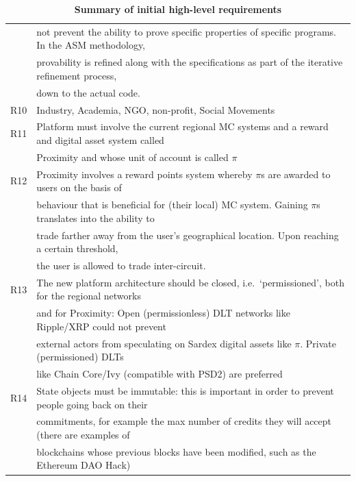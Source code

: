 \begin{table}[htbp]
\begin{centering}
{\begin{tabular}{| l | l | }
&\hspace{0.5cm}not prevent the ability to prove specific properties of specific programs. In the ASM methodology,\\
&\hspace{0.5cm}provability is refined along with the specifications as part of the iterative refinement process,\\
&\hspace{0.5cm}down to the actual code.\\
\hline
R10 &Industry, Academia, NGO, non-profit, Social Movements\\
\hline
R11 &Platform must involve the current regional MC systems and a reward and digital asset system called\\
&\hspace{0.5cm}Proximity and whose unit of account is called $\pi$\\
\hline
R12 &Proximity involves a reward points system whereby $\pi$s are awarded to users on the basis of\\
&\hspace{0.5cm}behaviour that is beneficial for (their local) MC system. Gaining $\pi$s translates into the ability to\\
&\hspace{0.5cm}trade farther away from the user's geographical location. Upon reaching a certain threshold,\\
&\hspace{0.5cm}the user is allowed to trade inter-circuit.  \\
\hline
R13 &The new platform architecture should be closed, i.e.\ `permissioned', both for the regional networks\\
&\hspace{0.5cm}and for Proximity: Open (permissionless) DLT networks like Ripple/XRP could not prevent\\
&\hspace{0.5cm}external actors from speculating on Sardex digital assets like $\pi$. Private (permissioned) DLTs\\
&\hspace{0.5cm}like Chain Core/Ivy (compatible with PSD2) are preferred \\
\hline
R14 &State objects must be immutable: this is important in order to prevent people going back on their\\
&\hspace{0.5cm}commitments, for example the max number of credits they will accept (there are examples of\\
&\hspace{0.5cm}blockchains whose previous blocks have been modified, such as the Ethereum DAO Hack)  \\
\hline
\end{tabular}}
\caption{\small\textbf{Summary of initial high-level requirements}}
\label{ReqTable}
\end{centering}
\end{table}

